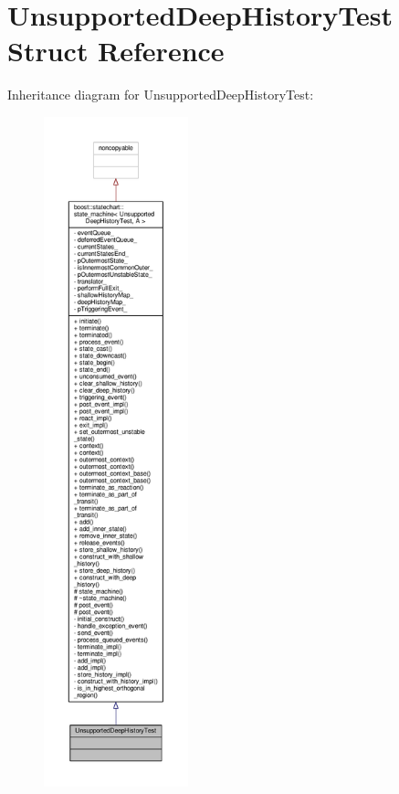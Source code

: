 \hypertarget{struct_unsupported_deep_history_test}{}\section{Unsupported\+Deep\+History\+Test Struct Reference}
\label{struct_unsupported_deep_history_test}


Inheritance diagram for Unsupported\+Deep\+History\+Test\+:
\nopagebreak
\begin{figure}[H]
\begin{center}
\leavevmode
\includegraphics[height=550pt]{struct_unsupported_deep_history_test__inherit__graph}
\end{center}
\end{figure}


